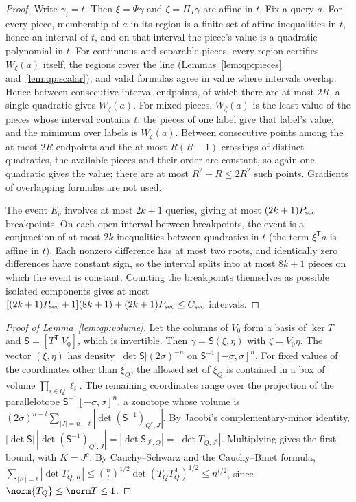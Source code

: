 \begin{proof}
Write $\gamma_i=t$. Then $\xi=\Psi\gamma$ and $\zeta=\Pi_T\gamma$ are affine in
$t$. Fix a query $a$. For every piece, membership of $a$ in its region is a
finite set of affine inequalities in $t$, hence an interval of $t$, and on
that interval the piece's value is a quadratic polynomial in $t$. For
continuous and separable pieces, every region certifies $W_\zeta(a)$ itself,
the regions cover the line (Lemmas~\ref{lem:qp:pieces} and~\ref{lem:qp:scalar}),
and valid formulas agree in value where intervals overlap. Hence between
consecutive interval endpoints, of which there are at most $2R$, a single
quadratic gives $W_\zeta(a)$. For mixed pieces, $W_\zeta(a)$ is the least value
of the pieces whose interval contains $t$: the pieces of one label give that
label's value, and the minimum over labels is $W_\zeta(a)$. Between
consecutive points among the at most $2R$ endpoints and the at most $R(R-1)$
crossings of distinct quadratics, the available pieces and their order are
constant, so again one quadratic gives the value; there are at most
$R^2+R\le2R^2$ such points. Gradients of overlapping formulas are not used.

The event $E_v$ involves at most $2k+1$ queries, giving at most
$(2k+1)P_{\rm sec}$ breakpoints. On each open interval between breakpoints, the
event is a conjunction of at most $2k$ inequalities between quadratics in $t$
(the term $\xi^{\mathsf T} a$ is affine in $t$). Each nonzero difference has at most
two roots, and identically zero differences have constant sign, so the
interval splits into at most $8k+1$ pieces on which the event is constant.
Counting the breakpoints themselves as possible isolated components gives at
most $[(2k+1)P_{\rm sec}+1](8k+1)+(2k+1)P_{\rm sec}\le C_{\rm sec}$ intervals.
\end{proof}

\begin{proof}[Proof of Lemma~\ref{lem:qp:volume}]
Let the columns of $V_0$ form a basis of $\ker T$ and $\mathsf S=[T^{\mathsf T}\ V_0]$,
which is invertible. Then $\gamma=\mathsf S(\xi,\eta)$ with $\zeta=V_0\eta$. The
vector $(\xi,\eta)$ has density $|\det\mathsf S|(2\sigma)^{-n}$ on
$\mathsf S^{-1}[-\sigma,\sigma]^n$. For fixed values of the coordinates other
than $\xi_Q$, the allowed set of $\xi_Q$ is contained in a box of volume
$\prod_{i\in Q}\ell_i$. The remaining coordinates range over the projection of
the parallelotope $\mathsf S^{-1}[-\sigma,\sigma]^n$, a zonotope whose volume is
$(2\sigma)^{n-t}\sum_{|J|=n-t}|\det(\mathsf S^{-1})_{Q^c,J}|$. By Jacobi's
complementary-minor identity,
$|\det\mathsf S|\,|\det(\mathsf S^{-1})_{Q^c,J}|=|\det\mathsf S_{J^c,Q}|=|\det T_{Q,J^c}|$.
Multiplying gives the first bound, with $K=J^c$. By Cauchy--Schwarz and the
Cauchy--Binet formula,
$\sum_{|K|=t}|\det T_{Q,K}|\le\binom nt^{1/2}\det(T_QT_Q^{\mathsf T})^{1/2}\le n^{t/2}$,
since $\norm{T_Q}\le\norm T\le1$.
\end{proof}

